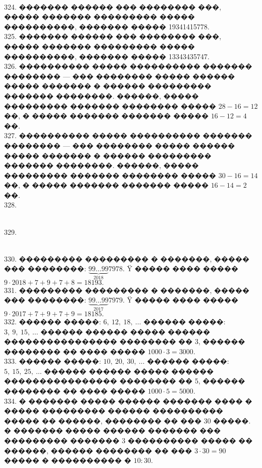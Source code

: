 \documentclass[12pt]{article}
\begin{document}
\begin{figure}[ht!]
\end{figure}\\
324. ������� ������ ��� �������� ���, ����� ������� ��������� ����� ����������, ������� ����� 19341415778.\\
325. ������� ������ ��� �������� ���, ����� ������� ��������� ����� ����������, ������� ����� 13343435747.\\
326. ���������� ����� ���������� ������� �������� --- ��� �������� ����� ������ ����� ������� � ������ ��������� ������� ��������. ������, ����� ��������� ������� �������� ����� $28-16=12$��, � ����� ������� ������� ����� $16-12=4$��.\\
327. ���������� ����� ���������� ������� �������� --- ��� �������� ����� ������ ����� ������� � ������ ��������� ������� ��������. ������, ����� ��������� ������� �������� ����� $30-16=14$��, � ����� ������� ������� ����� $16-14=2$��.\\
328. \begin{figure}[ht!]
\end{figure}\\
329. \begin{figure}[ht!]
\end{figure}\\
330. ��������� ��������� � �������, ����� ��� ��������: $\underbrace{99\ldots99}_{2018}7978.$ Ÿ ����� ���� ����� $9\cdot2018+7+9+7+8=18193.$\\
331. ��������� ��������� � �������, ����� ��� ��������: $\underbrace{99\ldots99}_{2017}7979.$ Ÿ ����� ���� ����� $9\cdot2017+7+9+7+9=18185.$\\
332. ������ �����: $6,\ 12,\ 18,\ \ldots$ ������ �����: $3,\ 9,\ 15,\ \ldots$ ������ ������ ����� ������ ���������������� �������� �� 3, ������ �������� �� ���� ����� $1000\cdot3=3000.$\\
333. ������ �����: $10,\ 20,\ 30,\ \ldots$ ������ �����: $5,\ 15,\ 25,\ \ldots$ ������ ������ ����� ������ ���������������� �������� �� 5, ������ �������� �� ���� ����� $1000\cdot5=5000.$\\
334. � ������� ����� ������ ������� ���� � ����� ��������� ������ ���������� ����� �� ������, �������� �� ��� 30 �����. � ������� ����� ������ ������� ��� ��������� ������� 3 ���������� ����� �� ������, ������ �������� �� ��� $3\cdot30=90$ ����� � ���������� � $10:30.$\\
\end{document}
